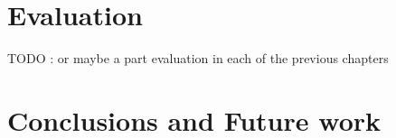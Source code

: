 \documentclass[12pt,twoside]{report}
\begin{document}
\chapter{Evaluation}

TODO : or maybe a part evaluation in each of the previous chapters

\chapter{Conclusions and Future work}

\end{document}
